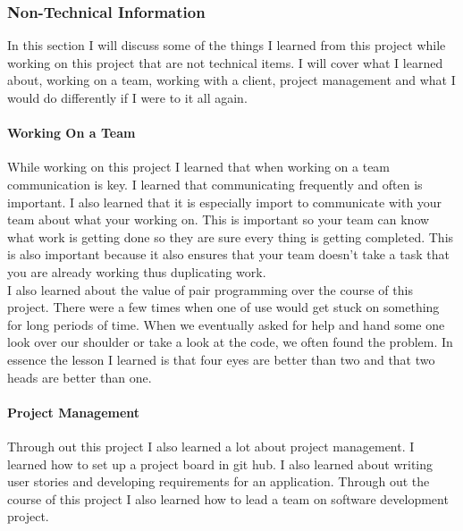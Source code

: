 \documentclass[onecolumn, draftclsnofoot,10pt, compsoc]{article}
\begin{document}
        \subsubsection{Non-Technical Information}
        In this section I will discuss some of the things I learned from this project while working on this project that are not technical items. I will cover what I learned about, working on a team, working with a client, project management and what I would do differently if I were to it all again.\\
        
            \paragraph{Working On a Team}
            While working on this project I learned that when working on a team communication is key. I learned that communicating frequently and often is important. I also learned that it is especially import to communicate with your team about what your working on. This is important so your team can know what work is getting done so they are sure every thing is getting completed. This is also important because it also ensures that your team doesn't take a task that you are already working thus duplicating work.\\
            
            I also learned about the value of pair programming over the course of this project. There were a few times when one of use would get stuck on something for long periods of time. When we eventually asked for help and hand some one look over our shoulder or take a look at the code, we often found the problem. In essence the lesson I learned is that four eyes are better than two and that two heads are better than one.\\
            
            \paragraph{Project Management}
            
            Through out this project I also learned a lot about project management. I learned how to set up a project board in git hub. I also learned about writing user stories and developing requirements for an application. Through out the course of this project I also learned how to lead a team on software development project.\\
            
\end{document}
